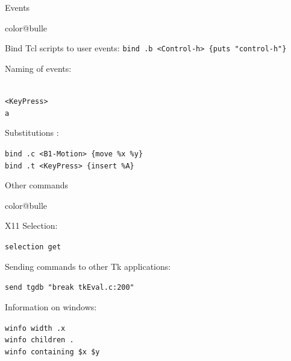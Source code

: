 \documentclass[a4paper,landscape,smooth]{show}
\begin{document}

\begin{tslide}{Events}
   \vfill
   \begin{bitemize}{color@bulle}
      \item Bind Tcl scripts to user events:
         {\tt bind .b <Control-h> \{puts "control-h"\}}

      \item Naming of events: 

	 {\tt <Double-Control-ButtonPress-1> \\
	       <KeyPress> \\
	       a}

      \item Substitutions : 

	 {\tt bind .c <B1-Motion> \{move \%x \%y\}\\
	       bind .t <KeyPress> \{insert \%A\}}
   \end{bitemize}
   \vfill
\end{tslide}



\begin{tslide}{Other commands}
   \vfill
   \begin{bitemize}{color@bulle}
      \item X11 Selection: 

	 {\tt selection get}

      \item Sending commands to other Tk applications: 

	 {\tt send tgdb "break tkEval.c:200" }

      \item Information on windows:

	 {\tt winfo width .x\\
	       winfo children .\\
	       winfo containing \$x \$y}
   \end{bitemize}
   \vfill
\end{tslide}


\vfill\eject\null\vfill\eject
\end{document}
